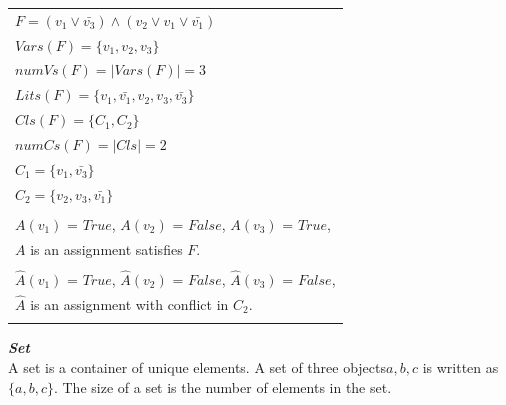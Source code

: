 \documentclass[12pt,a4paper,twoside]{scrartcl}
\numberwithin{equation}{section}
\begin{document}
\begin{center}
\begin{table}[H]
\begin{tabular}{l}
$F = (v_1 \lor \bar{v_3}) \land (v_2 \lor v_1 \lor \bar{v_1})$\\	
$Vars(F) = \{v_1, v_2, v_3\}$\\
$numVs(F) = |Vars(F)| = 3$\\
$Lits(F) = \{v_1, \bar{v_1}, v_2, v_3, \bar{v_3}\}$\\
$Cls(F) = \{C_1, C_2\}$\\
$numCs(F) = |Cls| = 2$\\ 
$C_1 = \{v_1, \bar{v_3}\}$\\
$C_2 = \{v_2, v_3, \bar{v_1}\}$\\
\\
$A(v_1)$ = $True$, $A(v_2)$ = $False$, $A(v_3)$ = $True$, \\
$A$  is an assignment satisfies $F$.\\
\\
$\hat{A}(v_1)$ = $True$, $\hat{A}(v_2)$ = $False$, $\hat{A}(v_3)$ = $False$, \\
$\hat{A}$  is an assignment with conflict in $C_2$.\\
\\
\end{tabular}
\label{table:kysymys}
\end{table}
\end{center}




\emph{\textbf{Set}}\\
A set is a container of unique elements. A set of three objects$ a, b, c$ is written as $\{a, b, c\}$. The
size of a set is the number of elements in the set.
\end{document}
